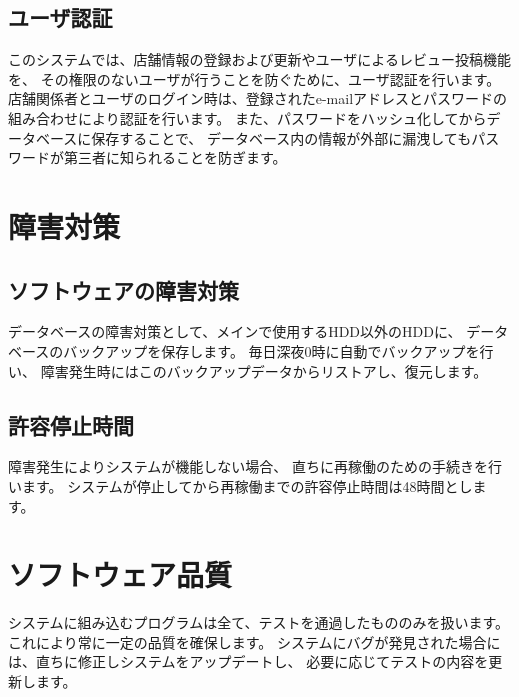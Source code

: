 \documentclass[a4j,titlepage]{jarticle}
\begin{document}
\subsection{ユーザ認証}
このシステムでは、店舗情報の登録および更新やユーザによるレビュー投稿機能を、
その権限のないユーザが行うことを防ぐために、ユーザ認証を行います。
店舗関係者とユーザのログイン時は、登録されたe-mailアドレスとパスワードの組み合わせにより認証を行います。
また、パスワードをハッシュ化してからデータベースに保存することで、
データベース内の情報が外部に漏洩してもパスワードが第三者に知られることを防ぎます。

\section{障害対策}
\subsection{ソフトウェアの障害対策}
データベースの障害対策として、メインで使用するHDD以外のHDDに、
データベースのバックアップを保存します。
毎日深夜0時に自動でバックアップを行い、
障害発生時にはこのバックアップデータからリストアし、復元します。
\subsection{許容停止時間}
障害発生によりシステムが機能しない場合、
直ちに再稼働のための手続きを行います。
システムが停止してから再稼働までの許容停止時間は48時間とします。

\section{ソフトウェア品質}
システムに組み込むプログラムは全て、テストを通過したもののみを扱います。
これにより常に一定の品質を確保します。
システムにバグが発見された場合には、直ちに修正しシステムをアップデートし、
必要に応じてテストの内容を更新します。
\end{document}
